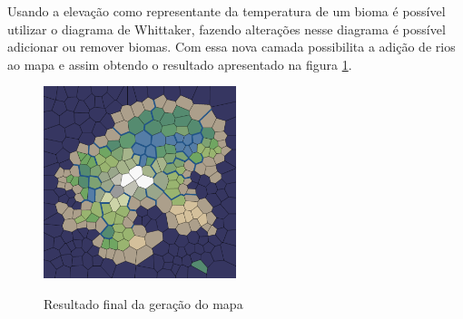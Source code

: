 Usando a elevação como representante da temperatura de um bioma é possível utilizar o diagrama de Whittaker, fazendo alterações nesse diagrama é possível adicionar ou remover biomas. Com essa nova camada possibilita a adição de rios ao mapa \cite{amitp2010} e assim obtendo o resultado apresentado na figura \ref{fig:biomes}.

\begin{figure}[H]
	\caption{Resultado final da geração do mapa}
	\centering
	\includegraphics[width=0.5\textwidth]{figures/biomes.png}
	\label{fig:biomes}
\end{figure}


